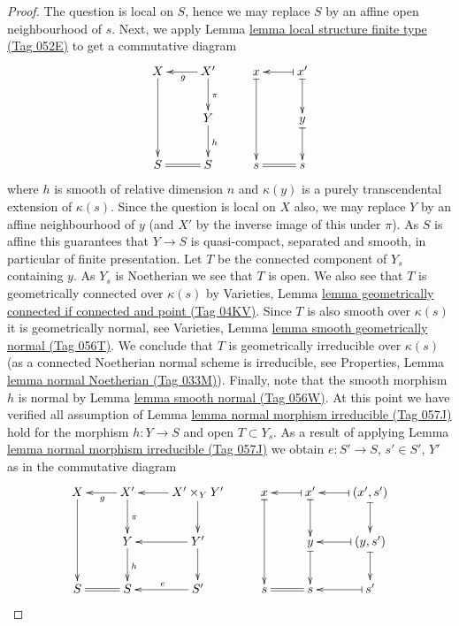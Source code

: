 \documentclass{amsart}
\theoremstyle{plain}
\theoremstyle{definition}
\theoremstyle{remark}
\numberwithin{equation}{subsection}
\begin{document}
\begin{proof}
The question is local on $S$, hence we may replace $S$ by an affine open
neighbourhood of $s$. Next, we apply
Lemma \href{https://stacks.math.columbia.edu/tag/052E}{lemma local structure finite type (Tag 052E)}
to get a commutative diagram
$$
\xymatrix{
X \ar[dd] & X' \ar[l]^g \ar[d]^\pi & x \ar@{|->}[dd] &
x' \ar@{|->}[l] \ar@{|->}[d] \\
& Y \ar[d]^h & & y \ar@{|->}[d] \\
S \ar@{=}[r] & S & s & s \ar@{=}[l]
}
$$
where $h$ is smooth of relative dimension $n$ and $\kappa(y)$ is
a purely transcendental extension of $\kappa(s)$. Since the question is
local on $X$ also, we may replace $Y$ by an affine neighbourhood of $y$
(and $X'$ by the inverse image of this under $\pi$). As $S$ is affine
this guarantees that $Y \to S$ is quasi-compact, separated and smooth,
in particular of finite presentation.
Let $T$ be the connected component of $Y_s$ containing $y$.
As $Y_s$ is Noetherian we see that $T$ is open.
We also see that $T$ is geometrically connected over $\kappa(s)$ by
Varieties,
Lemma \href{https://stacks.math.columbia.edu/tag/04KV}{lemma geometrically connected if connected and point (Tag 04KV)}.
Since $T$ is also smooth over $\kappa(s)$ it is geometrically normal, see
Varieties, Lemma \href{https://stacks.math.columbia.edu/tag/056T}{lemma smooth geometrically normal (Tag 056T)}.
We conclude that $T$ is geometrically irreducible over $\kappa(s)$ (as a
connected Noetherian normal scheme is irreducible, see
Properties, Lemma \href{https://stacks.math.columbia.edu/tag/033M}{lemma normal Noetherian (Tag 033M)}).
Finally, note that the smooth morphism $h$ is normal by
Lemma \href{https://stacks.math.columbia.edu/tag/056W}{lemma smooth normal (Tag 056W)}.
At this point we have verified all assumption of
Lemma \href{https://stacks.math.columbia.edu/tag/057J}{lemma normal morphism irreducible (Tag 057J)}
hold for the morphism $h : Y \to S$ and open $T \subset Y_s$.
As a result of applying
Lemma \href{https://stacks.math.columbia.edu/tag/057J}{lemma normal morphism irreducible (Tag 057J)}
we obtain $e : S' \to S$, $s' \in S'$, $Y'$ as
in the commutative diagram
$$
\xymatrix{
X \ar[dd] & X' \ar[l]^g \ar[d]^\pi & X' \times_Y Y' \ar[l] \ar[d] &
x \ar@{|->}[dd] & x' \ar@{|->}[l] \ar@{|->}[d] &
(x', s') \ar@{|->}[l] \ar@{|->}[d] \\
& Y \ar[d]^h & Y' \ar[d] \ar[l] & & y \ar@{|->}[d] &
(y, s') \ar@{|->}[l] \ar@{|->}[d] \\
S \ar@{=}[r] & S & S' \ar[l]_e & s & s \ar@{=}[l] & s' \ar@{|->}[l]
}$$
\end{proof}
\end{document}
